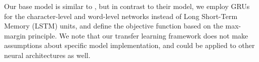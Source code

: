 Our base model is similar to \cite{lample2016neural}, but in contrast to their model, we employ GRUs for the character-level and word-level networks instead of Long Short-Term Memory (LSTM) units, and define the objective function based on the max-margin principle. We note that our transfer learning framework does not make assumptions about specific model implementation, and could be applied to other neural architectures \citep{collobert2011natural,chiu2015named,lample2016neural,ma2016end} as well.

